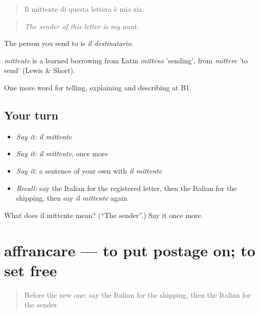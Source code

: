\begin{quote}
Il mittente di questa lettera è mia zia.
\end{quote}

\begin{quote}
\emph{The sender of this letter is my aunt.}
\end{quote}

The person you send to is \emph{il destinatario}.

\begin{cousinweb}
\emph{mittente} is a learned borrowing from Latin \emph{mittēns} 'sending', from \emph{mittere} 'to send' (Lewis \& Short).
\end{cousinweb}

\begin{grammarlens}[title={What you've built}]
One more word for telling, explaining and describing at B1.
\end{grammarlens}

\subsection*{Your turn}
\begin{itemize}
\raggedright
  \item \emph{Say it:} \emph{il mittente}
  \item \emph{Say it:} \emph{il mittente}, once more
  \item \emph{Say it:} a sentence of your own with \emph{il mittente}
  \item \emph{Recall:} say the Italian for the registered letter, then the Italian for the shipping, then say \emph{il mittente} again
\end{itemize}

\begin{tcolorbox}[breakable,colback=teal!4,colframe=teal!35!black,title={Before you move on}]
What does il mittente mean? (\textquotedblleft{}The sender\textquotedblright{}.) Say it once more.
\end{tcolorbox}
\section[affrancare]{affrancare — to put postage on; to set free}

\label{lesson:IT-C458-affrancare}



\begin{quote}
Before the new one: say the Italian for the shipping, then the Italian for the sender.
\end{quote}

